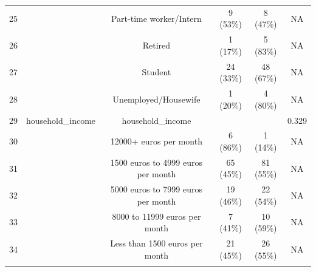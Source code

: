 \documentclass[
]{article}
\begin{document}
\begin{table}[!htbp]
\begin{tabular}{@{\extracolsep{5pt}} cccccc}
25 &  & Part-time worker/Intern & 9 (53\%) & 8 (47\%) & NA \\ 
26 &  & Retired & 1 (17\%) & 5 (83\%) & NA \\ 
27 &  & Student & 24 (33\%) & 48 (67\%) & NA \\ 
28 &  & Unemployed/Housewife & 1 (20\%) & 4 (80\%) & NA \\ 
29 & household\_income & household\_income &  &  & 0.329 \\ 
30 &  & 12000+ euros per month & 6 (86\%) & 1 (14\%) & NA \\ 
31 &  & 1500 euros to 4999 euros per month & 65 (45\%) & 81 (55\%) & NA \\ 
32 &  & 5000 euros to 7999 euros per month & 19 (46\%) & 22 (54\%) & NA \\ 
33 &  & 8000 to 11999 euros per month & 7 (41\%) & 10 (59\%) & NA \\ 
34 &  & Less than 1500 euros per month & 21 (45\%) & 26 (55\%) & NA \\ 
\hline \\[-1.8ex] 
\end{tabular} 
\end{table}
\end{document}
